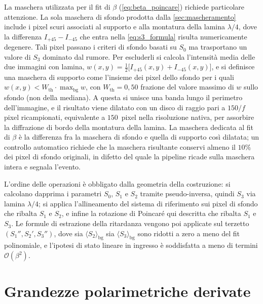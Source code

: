 La maschera utilizzata per il fit di $\beta$ (\cref{eq:beta_poincare}) richiede particolare attenzione. La sola maschera di sfondo prodotta dalla \cref{sec:mascheramento} include i pixel scuri associati al supporto e alla montatura della lamina $\lambda/4$, dove la differenza $I_{+45} - I_{-45}$ che entra nella \cref{eq:s3_formula} risulta numericamente degenere. Tali pixel passano i criteri di sfondo basati su $S_0$ ma trasportano un valore di $S_3$ dominato dal rumore. Per escluderli si calcola l'intensità media delle due immagini con lamina, $w(x, y) = \tfrac{1}{2}\bigl[I_{+45}(x, y) + I_{-45}(x, y)\bigr]$, e si definisce una maschera di supporto come l'insieme dei pixel dello sfondo per i quali $w(x, y) < W_{\mathrm{th}}\cdot \max_{\mathrm{bg}} w$, con $W_{\mathrm{th}} = 0{,}50$ frazione del valore massimo di $w$ sullo sfondo (non della mediana). A questa si unisce una banda lungo il perimetro dell'immagine, e il risultato viene dilatato con un disco di raggio pari a $150/f$ pixel ricampionati, equivalente a $150$~pixel nella risoluzione nativa, per assorbire la diffrazione di bordo della montatura della lamina. La maschera dedicata al fit di $\beta$ è la differenza fra la maschera di sfondo e quella di supporto così dilatata; un controllo automatico richiede che la maschera risultante conservi almeno il $10\%$ dei pixel di sfondo originali, in difetto del quale la pipeline ricade sulla maschera intera e segnala l'evento.

L'ordine delle operazioni è obbligato dalla geometria della costruzione: si calcolano dapprima i parametri $S_0$, $S_1$ e $S_2$ tramite pseudo-inversa, quindi $S_3$ via lamina $\lambda/4$; si applica l'allineamento del sistema di riferimento sui pixel di sfondo che ribalta $S_1$ e $S_2$, e infine la rotazione di Poincaré qui descritta che ribalta $S_1$ e $S_3$. Le formule di estrazione della ritardanza vengono poi applicate sul terzetto $(S_1'', S_2', S_3'')$, dove sia $\langle S_2 \rangle_{\mathrm{bg}}$ sia $\langle S_3 \rangle_{\mathrm{bg}}$ sono ridotti a zero a meno del fit polinomiale, e l'ipotesi di stato lineare in ingresso è soddisfatta a meno di termini $\mathcal{O}(\beta^2)$.

\section{Grandezze polarimetriche derivate}
\label{sec:dolp_aolp}


